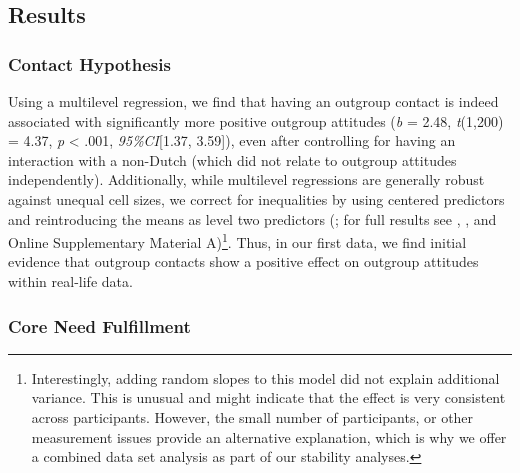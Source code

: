 \subsection{Results}

\subsubsection{Contact Hypothesis}

Using a multilevel regression, we find that having an outgroup contact
is indeed associated with significantly more positive outgroup attitudes
(\textit{b} = 2.48, \textit{t}(1,200) = 4.37, \textit{p} \textless{}
.001, \textit{95\%CI}{[}1.37, 3.59{]}), even after controlling for
having an interaction with a non-Dutch (which did not relate to outgroup
attitudes independently). Additionally, while multilevel regressions are
generally robust against unequal cell sizes, we correct for inequalities
by using centered predictors and reintroducing the means as level two
predictors (\citealp{yaremych2021a}; for full results see
, ,
and Online Supplementary Material
A)\footnote{Interestingly, adding random slopes to this model did not explain additional variance. This is unusual and might indicate that the effect is very consistent across participants. However, the small number of participants, or other measurement issues provide an alternative explanation, which is why we offer a combined data set analysis as part of our stability analyses.}.
Thus, in our first data, we find initial evidence that outgroup contacts
show a positive effect on outgroup attitudes within real-life data.

\subsubsection{Core Need Fulfillment}

